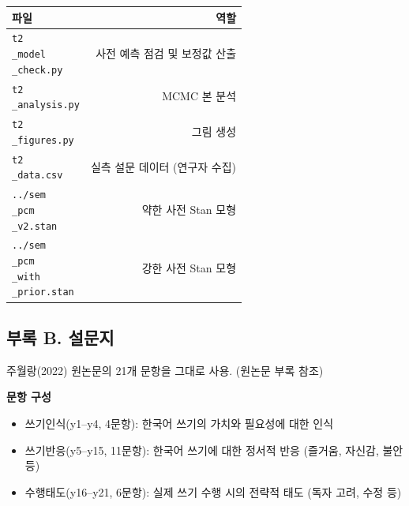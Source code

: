 \documentclass[a4paper,10pt]{oblivoir}
\begin{document}
\begin{table}[htbp]
\centering
\small
\begin{tabular}{lr}
\toprule
파일 & 역할 \\
\midrule
\texttt{t2\\_model\\_check.py} & 사전 예측 점검 및 보정값 산출 \\
\texttt{t2\\_analysis.py} & MCMC 본 분석 \\
\texttt{t2\\_figures.py} & 그림 생성 \\
\texttt{t2\\_data.csv} & 실측 설문 데이터 (연구자 수집) \\
\texttt{../sem\\_pcm\\_v2.stan} & 약한 사전 Stan 모형 \\
\texttt{../sem\\_pcm\\_with\\_prior.stan} & 강한 사전 Stan 모형 \\
\bottomrule
\end{tabular}
\end{table}

\subsection{부록 B. 설문지}

주월랑(2022) 원논문의 21개 문항을 그대로 사용. (원논문 부록 참조)

\textbf{문항 구성}

\begin{itemize}
  \item 쓰기인식(y1–y4, 4문항): 한국어 쓰기의 가치와 필요성에 대한 인식
  \item 쓰기반응(y5–y15, 11문항): 한국어 쓰기에 대한 정서적 반응 (즐거움, 자신감, 불안 등)
  \item 수행태도(y16–y21, 6문항): 실제 쓰기 수행 시의 전략적 태도 (독자 고려, 수정 등)
\end{itemize}
\end{document}
